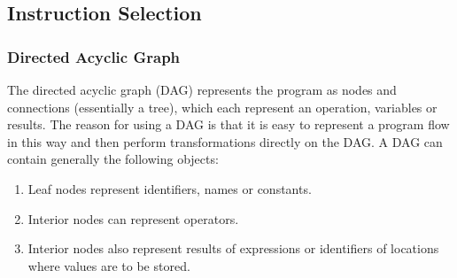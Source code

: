 \subsection{Instruction Selection}
\label{subsec:instruction_selection}

\subsubsection{Directed Acyclic Graph}

The directed acyclic graph (DAG) represents the program as nodes and connections (essentially a tree),
which each represent an operation, variables or results. The reason for using a DAG is that
it is easy to represent a program flow in this way and then perform transformations directly on the DAG.
A DAG can contain generally the following objects:
\begin{enumerate}
  \item Leaf nodes represent identifiers, names or constants.
  \item Interior nodes can represent operators.
  \item Interior nodes also represent results of expressions or identifiers of locations where values are to be stored.
\end{enumerate}

